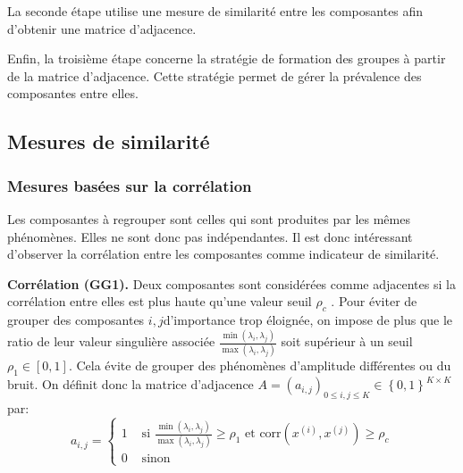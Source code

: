 \documentclass{gretsi}
\newcommand{\inter}{\left[0, 1\right]}
\begin{document}
La seconde étape utilise une mesure de similarité entre les composantes afin d'obtenir une matrice d'adjacence.%

Enfin, la troisième étape concerne la stratégie de formation des groupes à partir de la matrice d'adjacence. Cette stratégie permet de gérer la prévalence des composantes entre elles.


\subsection{Mesures de similarité}
\label{sub:sim}

\subsubsection{Mesures basées sur la corrélation}\label{ssub:cor}

Les composantes à regrouper sont celles qui sont produites par les mêmes phénomènes.
Elles ne sont donc pas indépendantes.
Il est donc intéressant d'observer la corrélation entre les composantes comme indicateur de similarité.

\textbf{Corrélation (GG1).}\label{par:GG1}
    Deux composantes sont considérées comme adjacentes si la corrélation entre elles est plus haute qu'une valeur seuil $\rho_c$ \cite{abalov_14_auto}.
    Pour éviter de grouper des composantes $i, j$d'importance trop éloignée, on impose de plus que le ratio de leur valeur singulière associée $\frac{\min(\lambda_i, \lambda_j)}{\max(\lambda_i, \lambda_j)}$ soit supérieur à un seuil $\rho_1 \in \inter$.
    Cela évite de grouper des phénomènes d'amplitude différentes ou du bruit.
    On définit donc la matrice d'adjacence $A = (a_{i, j})_{0 \le i,j\le K} \in \left \{ 0, 1 \right \}^{K\times K}$ par:
    \begin{equation}
        a_{i, j} = \begin{cases}
	        1 &\text{ si } \displaystyle\frac{\min(\lambda_i, \lambda_j)}{\max(\lambda_i, \lambda_j)} \ge \rho_1 \text{ et } \text{corr}(x^{(i)}, x^{(j)}) \ge \rho_c\\
	        0& \text{ sinon}
        \end{cases}
    \end{equation}
\end{document}
